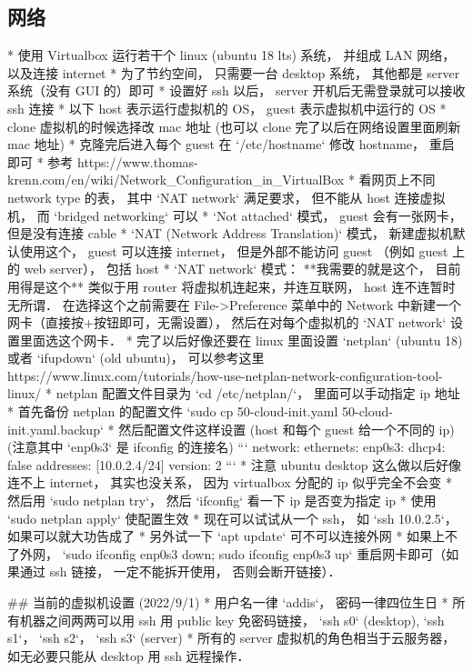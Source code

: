 \subsection{网络}

* 使用 Virtualbox 运行若干个 linux (ubuntu 18 lts) 系统， 并组成 LAN 网络， 以及连接 internet
* 为了节约空间， 只需要一台 desktop 系统， 其他都是 server 系统（没有 GUI 的）即可
* 设置好 ssh 以后， server 开机后无需登录就可以接收 ssh 连接
* 以下 host 表示运行虚拟机的 OS， guest 表示虚拟机中运行的 OS
* clone 虚拟机的时候选择改 mac 地址 (也可以 clone 完了以后在网络设置里面刷新 mac 地址)
* 克隆完后进入每个 guest 在 `/etc/hostname` 修改 hostname， 重启即可
* 参考 https://www.thomas-krenn.com/en/wiki/Network_Configuration_in_VirtualBox
* 看网页上不同 network type 的表， 其中 `NAT network` 满足要求， 但不能从 host 连接虚拟机， 而 `bridged networking` 可以
* `Not attached` 模式， guest 会有一张网卡， 但是没有连接 cable
* `NAT (Network Address Translation)` 模式， 新建虚拟机默认使用这个， guest 可以连接 internet， 但是外部不能访问 guest （例如 guest 上的 web server）， 包括 host
* `NAT network` 模式： **我需要的就是这个， 目前用得是这个** 类似于用 router 将虚拟机连起来，并连互联网， host 连不连暂时无所谓． 在选择这个之前需要在 File->Preference 菜单中的 Network 中新建一个网卡（直接按+按钮即可，无需设置）， 然后在对每个虚拟机的 `NAT network` 设置里面选这个网卡．
* 完了以后好像还要在 linux 里面设置 `netplan` (ubuntu 18) 或者 `ifupdown` (old ubuntu)， 可以参考这里 https://www.linux.com/tutorials/how-use-netplan-network-configuration-tool-linux/
* netplan 配置文件目录为 `cd /etc/netplan/`， 里面可以手动指定 ip 地址
* 首先备份 netplan 的配置文件 `sudo cp 50-cloud-init.yaml 50-cloud-init.yaml.backup`
* 然后配置文件这样设置 (host 和每个 guest 给一个不同的 ip) (注意其中 `enp0s3` 是 ifconfig 的连接名)
```
network:
    ethernets:
        enp0s3:
            dhcp4: false
            addresses: [10.0.2.4/24]
    version: 2
```
* 注意 ubuntu desktop 这么做以后好像连不上 internet， 其实也没关系， 因为 virtualbox 分配的 ip 似乎完全不会变
* 然后用 `sudo netplan try`， 然后 `ifconfig` 看一下 ip 是否变为指定 ip
* 使用 `sudo netplan apply` 使配置生效
* 现在可以试试从一个 ssh， 如 `ssh 10.0.2.5`， 如果可以就大功告成了
* 另外试一下 `apt update` 可不可以连接外网
* 如果上不了外网， `sudo ifconfig enp0s3 down; sudo ifconfig enp0s3 up` 重启网卡即可（如果通过 ssh 链接， 一定不能拆开使用， 否则会断开链接）．

## 当前的虚拟机设置 (2022/9/1)
* 用户名一律 `addis`， 密码一律四位生日
* 所有机器之间两两可以用 ssh 用 public key 免密码链接， `ssh s0` (desktop), `ssh s1`， `ssh s2`， `ssh s3` (server)
* 所有的 server 虚拟机的角色相当于云服务器， 如无必要只能从 desktop 用 ssh 远程操作．

